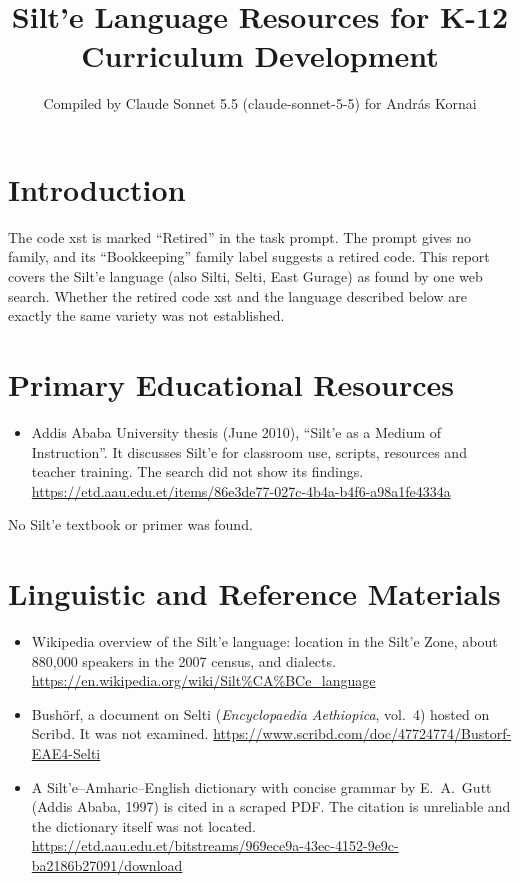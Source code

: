 \documentclass[12pt]{article}
\title{Silt'e Language Resources for K-12 Curriculum Development}
\author{Compiled by Claude Sonnet 5.5 (claude-sonnet-5-5) for Andr\'as Kornai}
\date{}
\begin{document}
\maketitle

\section{Introduction}
The code xst is marked ``Retired'' in the task prompt. The prompt gives no family, and its ``Bookkeeping'' family label suggests a retired code. This report covers the Silt'e language (also Silti, Selti, East Gurage) as found by one web search. Whether the retired code xst and the language described below are exactly the same variety was not established.

\section{Primary Educational Resources}
\begin{itemize}
\item Addis Ababa University thesis (June 2010), ``Silt'e as a Medium of Instruction''. It discusses Silt'e for classroom use, scripts, resources and teacher training. The search did not show its findings. \url{https://etd.aau.edu.et/items/86e3de77-027c-4b4a-b4f6-a98a1fe4334a}
\end{itemize}
No Silt'e textbook or primer was found.

\section{Linguistic and Reference Materials}
\begin{itemize}
\item Wikipedia overview of the Silt'e language: location in the Silt'e Zone, about 880,000 speakers in the 2007 census, and dialects. \url{https://en.wikipedia.org/wiki/Silt%CA%BCe_language}
\item Bush\"orf, a document on Selti (\emph{Encyclopaedia Aethiopica}, vol.~4) hosted on Scribd. It was not examined. \url{https://www.scribd.com/doc/47724774/Bustorf-EAE4-Selti}
\item A Silt'e--Amharic--English dictionary with concise grammar by E.~A.~Gutt (Addis Ababa, 1997) is cited in a scraped PDF. The citation is unreliable and the dictionary itself was not located. \url{https://etd.aau.edu.et/bitstreams/969ece9a-43ec-4152-9e9c-ba2186b27091/download}
\end{itemize}
\end{document}

